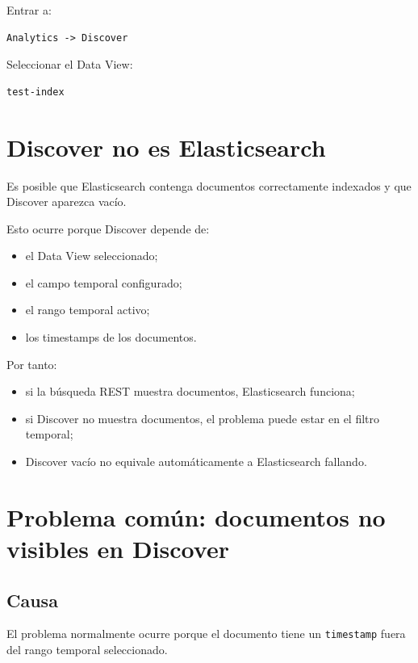 \documentclass[
  coursetitle={Cómputo Nube y Tecnologías Emergentes},
  coursehours={96},
  coursedate={Verano 2026},
  doctype={Práctica},
  otherlangs={english,french},
  authorname={Lázaro},
  authorsurname={Bustio-Martínez},
  authortitle={PhD},
  role={Profesor Investigador},
  email={lbustio@inaoe.mx},
  phone={5559504000},
  ext={7459},
  institution={Instituto Nacional de Astrofísica, Óptica y Electrónica (INAOE)},
  department={Maestría en Ciencias en Tecnologías de Seguridad},
  address={Luis Enrique Erro 1, Sta. Ma. Tonantzintla, San Andrés Cholula, CP 72840, Puebla, México},
  margin={0.5in}
]{../../lbustio_lecture_notes}
\begin{document}
Entrar a:

\begin{verbatim}
Analytics -> Discover
\end{verbatim}

Seleccionar el Data View:

\begin{verbatim}
test-index
\end{verbatim}

\section{Discover no es Elasticsearch}

Es posible que Elasticsearch contenga documentos correctamente indexados y que Discover aparezca vacío.

Esto ocurre porque Discover depende de:

\begin{itemize}
    \item el Data View seleccionado;
    \item el campo temporal configurado;
    \item el rango temporal activo;
    \item los timestamps de los documentos.
\end{itemize}

Por tanto:

\begin{itemize}
    \item si la búsqueda REST muestra documentos, Elasticsearch funciona;
    \item si Discover no muestra documentos, el problema puede estar en el filtro temporal;
    \item Discover vacío no equivale automáticamente a Elasticsearch fallando.
\end{itemize}

\section{Problema común: documentos no visibles en Discover}

\subsection{Causa}

El problema normalmente ocurre porque el documento tiene un \texttt{timestamp} fuera del rango temporal seleccionado.
\end{document}
